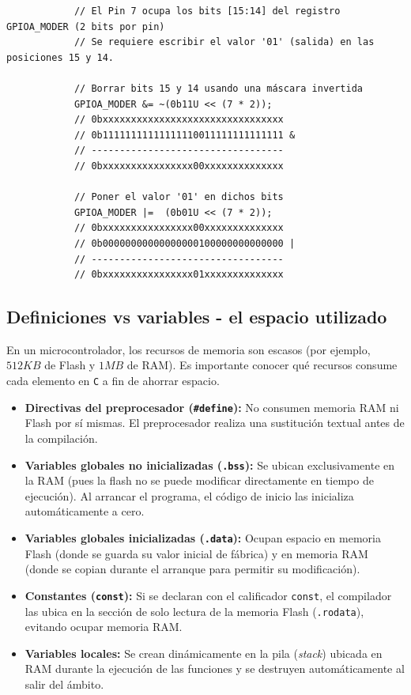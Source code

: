 \documentclass[../main.tex]{subfiles}
\begin{document}
        \begin{lstlisting}
            // El Pin 7 ocupa los bits [15:14] del registro GPIOA_MODER (2 bits por pin)
            // Se requiere escribir el valor '01' (salida) en las posiciones 15 y 14.

            // Borrar bits 15 y 14 usando una máscara invertida
            GPIOA_MODER &= ~(0b11U << (7 * 2)); 
            // 0bxxxxxxxxxxxxxxxxxxxxxxxxxxxxxxxx
            // 0b11111111111111110011111111111111 &
            // ----------------------------------
            // 0bxxxxxxxxxxxxxxxx00xxxxxxxxxxxxxx

            // Poner el valor '01' en dichos bits
            GPIOA_MODER |=  (0b01U << (7 * 2)); 
            // 0bxxxxxxxxxxxxxxxx00xxxxxxxxxxxxxx
            // 0b00000000000000000100000000000000 |
            // ----------------------------------
            // 0bxxxxxxxxxxxxxxxx01xxxxxxxxxxxxxx
        \end{lstlisting}

        

    \subsection{Definiciones vs variables - el espacio utilizado}

        En un microcontrolador, los recursos de memoria son escasos (por ejemplo, $512KB$ de Flash y $1MB$ de RAM). Es importante conocer qué recursos consume cada elemento en \texttt{C} a fin de ahorrar espacio.

        \begin{itemize}
            \item \textbf{Directivas del preprocesador (\texttt{\#define}):} No consumen memoria RAM ni Flash por sí mismas. El preprocesador realiza una sustitución textual antes de la compilación.
            \item \textbf{Variables globales no inicializadas (\texttt{.bss}):} Se ubican exclusivamente en la RAM (pues la flash no se puede modificar directamente en tiempo de ejecución). Al arrancar el programa, el código de inicio las inicializa automáticamente a cero.
            \item \textbf{Variables globales inicializadas (\texttt{.data}):} Ocupan espacio en memoria Flash (donde se guarda su valor inicial de fábrica) y en memoria RAM (donde se copian durante el arranque para permitir su modificación).
            \item \textbf{Constantes (\texttt{const}):} Si se declaran con el calificador \texttt{const}, el compilador las ubica en la sección de solo lectura de la memoria Flash (\texttt{.rodata}), evitando ocupar memoria RAM.
            \item \textbf{Variables locales:} Se crean dinámicamente en la pila (\emph{stack}) ubicada en RAM durante la ejecución de las funciones y se destruyen automáticamente al salir del ámbito.
        \end{itemize}
\end{document}
